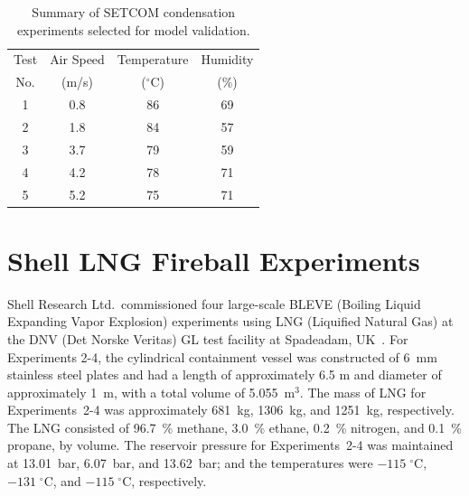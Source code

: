 \begin{table}[h]
	\caption[Summary of SETCOM condensation experiments selected for model validation]{Summary of SETCOM condensation experiments selected for model validation.}
	\begin{center}
		\begin{tabular}{|c|c|c|c|}
			\hline
			Test      &  Air Speed        &  Temperature          &  Humidity             \\
			No.       &  (m/s)            &  ($^{\circ}$C)        &  (\%)                 \\ \hline \hline
			1         &  0.8              &  86                   &  69                   \\ \hline
			2         &  1.8              &  84                   &  57                   \\ \hline
			3         &  3.7              &  79                   &  59                   \\ \hline
			4         &  4.2              &  78                   &  71                   \\ \hline
			5         &  5.2              &  75                   &  71                   \\ \hline
		\end{tabular}
	\end{center}
	\label{SETCOM_condensation_Summary}
\end{table}

\FloatBarrier


\section{Shell LNG Fireball Experiments}
\label{Shell_LNG_Fireballs_Description}

Shell Research Ltd.~commissioned four large-scale BLEVE (Boiling Liquid Expanding Vapor Explosion) experiments using LNG (Liquified Natural Gas) at the DNV (Det Norske Veritas) GL test facility at Spadeadam, UK~\cite{Betteridge:2015}. For Experiments 2-4, the cylindrical containment vessel was constructed of 6~mm stainless steel plates and had a length of approximately 6.5 m and diameter of approximately 1~m, with a total volume of 5.055~m$^3$. The mass of LNG for Experiments~2-4 was approximately 681~kg, 1306~kg, and 1251~kg, respectively. The LNG consisted of 96.7~\% methane, 3.0~\% ethane, 0.2~\% nitrogen, and 0.1~\% propane, by volume. The reservoir pressure for Experiments~2-4 was maintained at 13.01~bar, 6.07~bar, and 13.62~bar; and the temperatures were $-115 \; ^\circ$C, $-131 \; ^\circ$C, and $-115 \; ^\circ$C, respectively.

